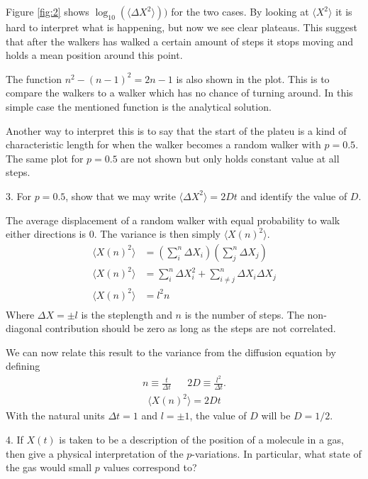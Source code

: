 \documentclass[twocolumn]{article}[10pt]
\begin{document}
Figure \ref{fig:2} shows $\log_{10}(\langle\Delta X^2 \rangle))$ for the two cases. 
By looking at $\langle X^2\rangle$ it is hard to interpret what is happening,
 but now we see clear plateaus. This suggest that after the walkers
has walked a certain amount of steps it stops moving and holds a mean 
position around this point. 

The function $n^2 - (n-1)^2 = 2n-1$ is also shown in the plot. This is to
compare the walkers to a walker which has no chance of turning around.
In this simple case the mentioned function is the analytical solution. 

Another way to interpret this is to say that the start of the plateu
is a kind of characteristic length for when the walker becomes a 
random walker with $p = 0.5$. The same plot for $p = 0.5$ are not shown
but only holds constant value at all steps. 

{\color{black!70} 3. For $p=0.5$, show that we may write 
$\langle\Delta X^2 \rangle = 2Dt$ and identify the value of $D$.
}

The average displacement of a random walker with equal probability 
to walk either directions is $0$. The variance is then simply
$\langle X(n)^2\rangle$. 
\begin{align*}
	\langle X(n)^2\rangle 
	&= 
	\left(\sum_i^n\Delta X_i\right)\left(\sum_j^n\Delta X_j\right)\\
	\langle X(n)^2\rangle 
	&= 
	\sum_i^n\Delta X_i^2 + \sum_{i\neq j}^n\Delta X_i\Delta X_j\\
	\langle X(n)^2\rangle 
	&= 
	l^2 n\\
\end{align*}
Where $\Delta X = \pm l$ is the steplength and $n$ is the number of steps. The non-diagonal contribution should be zero as long as the steps are not correlated. 

We can now relate this result to the variance from the diffusion equation by
defining 
\begin{align*}
n \equiv \frac{t}{\Delta t} && 2D \equiv \frac{l^2}{\Delta t}.
\end{align*}
\begin{align*}
\langle X(n)^2\rangle = 2Dt
\end{align*}
With the natural units $\Delta t = 1$ and $l = \pm1$, 
the value of $D$ will be $D = 1/2$.

{\color{black!70} 
4. If $X(t)$ is taken to be a description of the position of a molecule 
in a gas, then give a physical interpretation of the $p$-variations.
In particular, what state of the gas would small $p$ values 
correspond to?
}
\end{document}

